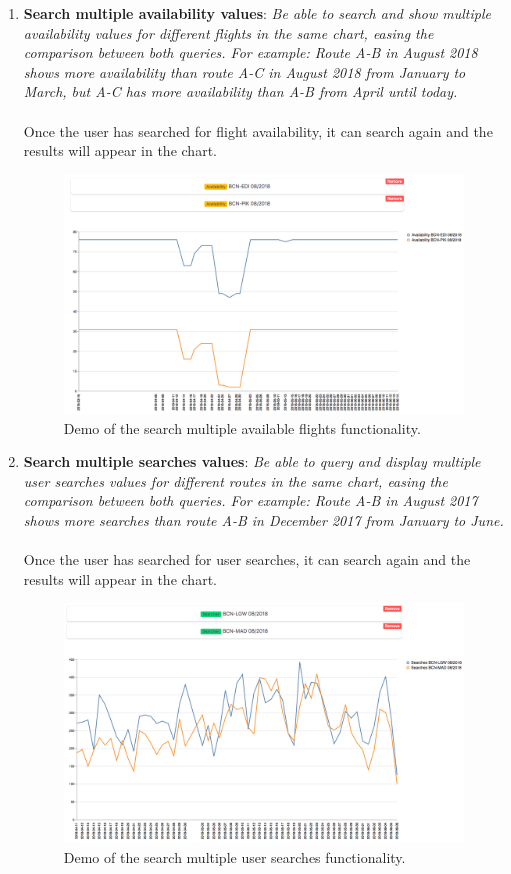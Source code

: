 \begin{enumerate}
    \item \textbf{Search multiple availability values}: \textit{Be able to search and show multiple availability values for different flights in the same chart, easing the comparison between both queries. For example: Route A-B in August 2018 shows more availability than route A-C in August 2018 from January to March, but A-C has more availability than A-B from April until today.}
    \\\\
    Once the user has searched for flight availability, it can search again and the results will appear in the chart.
    \begin{figure}[H]
    \centering
    \includegraphics[scale=0.3]{resources/search-multiple-availability.png}
    \caption{Demo of the search multiple available flights functionality.}
    \end{figure}

    \item \textbf{Search multiple searches values}: \textit{Be able to query and display multiple user searches values for different routes in the same chart, easing the comparison between both queries. For example: Route A-B in August 2017 shows more searches than route A-B in December 2017 from January to June.}
    \\\\
    Once the user has searched for user searches, it can search again and the results will appear in the chart.
    \begin{figure}[H]
    \centering
    \includegraphics[scale=0.3]{resources/search-multiple-searches.png}
    \caption{Demo of the search multiple user searches functionality.}
    \end{figure}


\end{enumerate}
